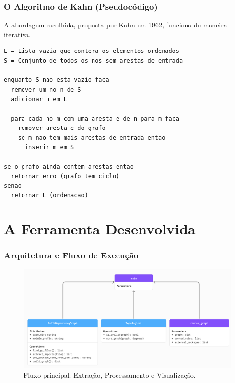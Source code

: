\documentclass{beamer}
\begin{document}
\begin{frame}[fragile]
    \frametitle{O Algoritmo de Kahn (Pseudocódigo)}
    
    A abordagem escolhida, proposta por Kahn em 1962, funciona de maneira iterativa.
    
    \begin{lstlisting}[language={}, basicstyle=\tiny\ttfamily]
L = Lista vazia que contera os elementos ordenados
S = Conjunto de todos os nos sem arestas de entrada

enquanto S nao esta vazio faca
  remover um no n de S
  adicionar n em L
  
  para cada no m com uma aresta e de n para m faca
    remover aresta e do grafo
    se m nao tem mais arestas de entrada entao
      inserir m em S

se o grafo ainda contem arestas entao
  retornar erro (grafo tem ciclo)
senao
  retornar L (ordenacao)
    \end{lstlisting}
\end{frame}

\section{A Ferramenta Desenvolvida}
\begin{frame}
  \frametitle{Arquitetura e Fluxo de Execução}

  \begin{figure}
    \includegraphics[width=\textwidth]{images/diagrama_classes.png}
    \caption{Fluxo principal: Extração, Processamento e Visualização.}
  \end{figure}
\end{frame}
\end{document}
